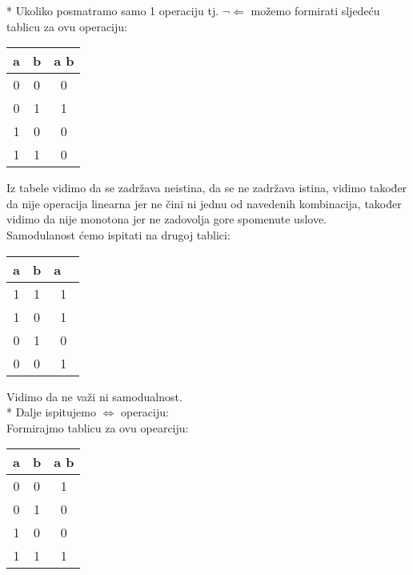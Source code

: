 \documentclass[12pt]{article}
\begin{document}
\begin{enumerate}
		  * Ukoliko posmatramo samo 1 operaciju tj. {$\neg$}{$\Leftarrow$} možemo formirati sljedeću tablicu za ovu operaciju: \\
		  
		  \begin{tabular}{|c|c|c|}
    	    \hline a & b & a \neg\Leftarrow b \\
    	    \hline 0 & 0 & 0 \\
    	    \hline 0 & 1 & 1 \\
    	    \hline 1 & 0 & 0 \\
        	\hline 1 & 1 & 0 \\
        	\hline
          \end{tabular}
		  
		  Iz tabele vidimo da se zadržava neistina, da se ne zadržava istina, vidimo također da nije operacija linearna jer ne čini ni jednu od navedenih kombinacija, također vidimo da nije monotona jer ne zadovolja gore spomenute uslove. \\
		  
		  Samodulanost ćemo ispitati na drugoj tablici: 
		  
		  \begin{tabular}{|c|c|c|}
    	    \hline a & b & a \vee~\overline{b} \\
    	    \hline 1 & 1 & 1 \\
    	    \hline 1 & 0 & 1 \\
    	    \hline 0 & 1 & 0 \\
        	\hline 0 & 0 & 1 \\
        	\hline
          \end{tabular}
          
          Vidimo da ne važi ni samodualnost. \\
          
          * Dalje ispitujemo {$\Leftrightarrow$} operaciju: \\   
          Formirajmo tablicu za ovu opearciju:
		  
		  \begin{tabular}{|c|c|c|}
    	    \hline a & b & a \Leftrightarrow b \\
    	    \hline 0 & 0 & 1 \\
    	    \hline 0 & 1 & 0 \\
    	    \hline 1 & 0 & 0 \\
        	\hline 1 & 1 & 1 \\
        	\hline
        	
          \end{tabular}
          \\
          

\end{enumerate}
\end{document}
